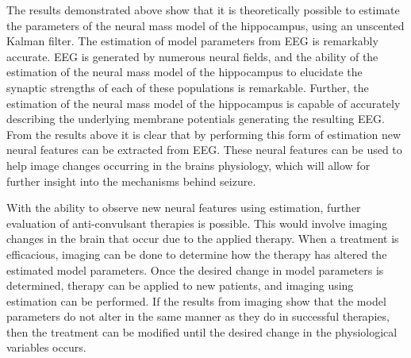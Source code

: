 The results demonstrated above show that it is theoretically possible to estimate the parameters of the neural mass model of the hippocampus, using an unscented Kalman filter. The estimation of model parameters from EEG is remarkably accurate. EEG is generated by numerous neural fields, and the ability of the estimation of the neural mass model of the hippocampus to elucidate the synaptic strengths of each of these populations is remarkable. Further, the estimation of the neural mass model of the hippocampus is capable of accurately describing the underlying membrane potentials generating the resulting EEG. From the results above it is clear that by performing this form of estimation new neural features can be extracted from EEG. These neural features can be used to help image changes occurring in the brains physiology, which will allow for further insight into the mechanisms behind seizure.

With the ability to observe new neural features using estimation, further evaluation of anti-convulsant therapies is possible. This would involve imaging changes in the brain that occur due to the applied therapy. When a treatment is efficacious, imaging can be done to determine how the therapy has altered the estimated model parameters. Once the desired change in model parameters is determined, therapy can be applied to new patients, and imaging using estimation can be performed. If the results from imaging show that the model parameters do not alter in the same manner as they do in successful therapies, then the treatment can be modified until the desired change in the physiological variables occurs.



